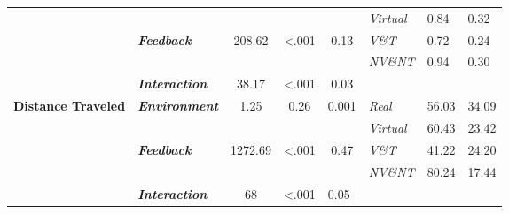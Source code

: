 \begin{table}[]
\begin{tabular}{|l|l|c|c|c|l|l|l|}
		&                                                &                                              &                                                     &                                            & \textit{Virtual} & 0.84          & 0.32        \\ \cline{2-8} 
		& \multirow{2}{*}{\textit{\textbf{Feedback}}}    & \multirow{2}{*}{208.62}                      & \multirow{2}{*}{\textless.001}                      & \multirow{2}{*}{0.13}                      & \textit{V\&T}    & 0.72          & 0.24        \\ \cline{6-8} 
		&                                                &                                              &                                                     &                                            & \textit{NV\&NT}  & 0.94          & 0.30        \\ \cline{2-8} 
		& \textit{\textbf{Interaction}}                  & 38.17                                        & \textless.001                                       & 0.03                                       & \multicolumn{3}{l|}{\textit{}}                 \\ \hline
		\multirow{5}{*}{\textbf{Distance Traveled}}          & \multirow{2}{*}{\textit{\textbf{Environment}}} & \multirow{2}{*}{1.25}                        & \multirow{2}{*}{0.26}                               & \multirow{2}{*}{0.001}                     & \textit{Real}    & 56.03         & 34.09       \\ \cline{6-8} 
		&                                                &                                              &                                                     &                                            & \textit{Virtual} & 60.43         & 23.42       \\ \cline{2-8} 
		& \multirow{2}{*}{\textit{\textbf{Feedback}}}    & \multirow{2}{*}{1272.69}                     & \multirow{2}{*}{\textless.001}                      & \multirow{2}{*}{0.47}                      & \textit{V\&T}    & 41.22         & 24.20       \\ \cline{6-8} 
		&                                                &                                              &                                                     &                                            & \textit{NV\&NT}  & 80.24         & 17.44       \\ \cline{2-8} 
		& \textit{\textbf{Interaction}}                  & 68                      & \multicolumn{1}{l|}{\textless.001}                  & \multicolumn{1}{l|}{0.05}                  & \multicolumn{3}{l|}{\textit{}}                 \\ \hline

\end{tabular}
\end{table}

